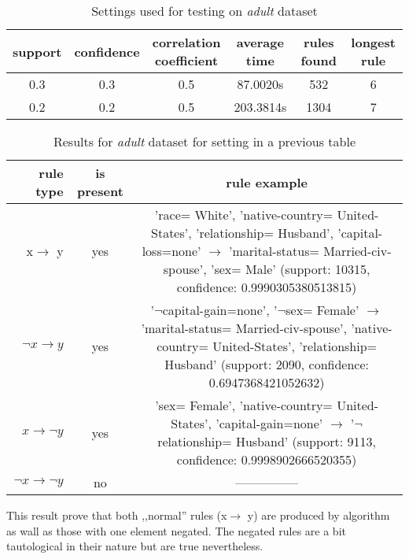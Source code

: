 \documentclass{article}
\begin{document}
	\begin{table}[H]
		\centering
		\label{as}
		\begin{tabular}{c |c |c|c|c|c}
			support&confidence&\makecell{correlation\\coefficient}&average time&rules found&longest rule\\
			\hline
			\hline
			0.3&0.3&0.5&87.0020s&532&6\\
			\hline
			0.2&0.2&0.5&203.3814s&1304&7\\
		\end{tabular}
		\caption{Settings used for testing on \textit{adult} dataset}
	\end{table}
	\begin{table}[H]
		\centering
		\label{ar}
		\begin{tabular}{r|c |c}
			rule type& is present & rule example\\
			\hline
			\hline
			x$\rightarrow$ y & yes & \makecell{'race= White', 'native-country= United-States',\\ 'relationship= Husband', 'capital-loss=none' $\rightarrow$\\ 'marital-status= Married-civ-spouse', 'sex= Male'\\ (support: 10315, confidence: 0.9990305380513815)}\\
			\hline
			$\neg x\rightarrow y$ & yes &\makecell{'$\neg$capital-gain=none', '$\neg$sex= Female' $\rightarrow$\\ 'marital-status= Married-civ-spouse',\\ 'native-country= United-States', 'relationship= Husband'\\ (support: 2090, confidence: 0.6947368421052632)}\\
			\hline
			$x\rightarrow \neg y $& yes &\makecell{'sex= Female', 'native-country= United-States',\\ 'capital-gain=none' $\rightarrow$\\ '$\neg$relationship= Husband'\\ (support: 9113, confidence: 0.9998902666520355)}\\
			\hline
			$\neg x\rightarrow \neg y $& no &---------------\\ 
		\end{tabular}
		\caption{Results for \textit{adult} dataset for setting in a previous table}
	\end{table}
	
	This result prove that both ,,normal'' rules  (x$\rightarrow$ y) are produced by algorithm as wall as those with one element negated. The negated rules are a bit tautological in their nature but are true nevertheless.
	
\end{document}
